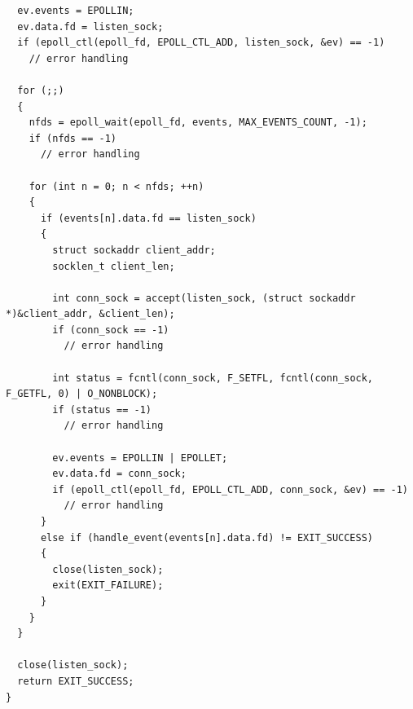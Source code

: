 \begin{lstlisting}
  ev.events = EPOLLIN;
  ev.data.fd = listen_sock;
  if (epoll_ctl(epoll_fd, EPOLL_CTL_ADD, listen_sock, &ev) == -1)
    // error handling

  for (;;)
  {
    nfds = epoll_wait(epoll_fd, events, MAX_EVENTS_COUNT, -1);
    if (nfds == -1)
      // error handling

    for (int n = 0; n < nfds; ++n)
    {
      if (events[n].data.fd == listen_sock)
      {
        struct sockaddr client_addr; 
        socklen_t client_len;
        
        int conn_sock = accept(listen_sock, (struct sockaddr *)&client_addr, &client_len);
        if (conn_sock == -1)
          // error handling
        
        int status = fcntl(conn_sock, F_SETFL, fcntl(conn_sock, F_GETFL, 0) | O_NONBLOCK);
        if (status == -1)
          // error handling

        ev.events = EPOLLIN | EPOLLET;
        ev.data.fd = conn_sock;
        if (epoll_ctl(epoll_fd, EPOLL_CTL_ADD, conn_sock, &ev) == -1)
          // error handling
      }
      else if (handle_event(events[n].data.fd) != EXIT_SUCCESS)
      {
        close(listen_sock);
        exit(EXIT_FAILURE);
      }
    }
  }

  close(listen_sock);
  return EXIT_SUCCESS;
}
\end{lstlisting}